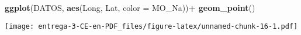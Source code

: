 \documentclass[
]{article}
\newenvironment{Shaded}{\begin{snugshade}}{\end{snugshade}}
\newcommand{\DataTypeTok}[1]{\textcolor[rgb]{0.13,0.29,0.53}{#1}}
\newcommand{\DecValTok}[1]{\textcolor[rgb]{0.00,0.00,0.81}{#1}}
\newcommand{\KeywordTok}[1]{\textcolor[rgb]{0.13,0.29,0.53}{\textbf{#1}}}
\newcommand{\NormalTok}[1]{#1}
\newcommand{\OperatorTok}[1]{\textcolor[rgb]{0.81,0.36,0.00}{\textbf{#1}}}
\newcommand{\StringTok}[1]{\textcolor[rgb]{0.31,0.60,0.02}{#1}}
\begin{document}
\begin{Shaded}
\begin{Highlighting}[]
\KeywordTok{ggplot}\NormalTok{(DATOS, }\KeywordTok{aes}\NormalTok{(Long, Lat, }\DataTypeTok{color =}\NormalTok{ MO_Na))}\OperatorTok{+}
\StringTok{  }\KeywordTok{geom_point}\NormalTok{()}
\end{Highlighting}
\end{Shaded}

\texttt{[image: entrega-3-CE-en-PDF\_files/figure-latex/unnamed-chunk-16-1.pdf]}

\begin{Shaded}
\end{Shaded}
\end{document}
